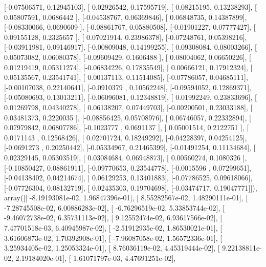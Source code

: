 \documentclass{article}
\begin{document}
       [-0.07506571,  0.12945103],
       [ 0.02926542,  0.17595719],
       [ 0.08215195,  0.13238293],
       [ 0.05807591,  0.0686442 ],
       [-0.04538767,  0.06369846],
       [ 0.06848735,  0.14387899],
       [-0.08330066,  0.0690609 ],
       [-0.08861767,  0.05880508],
       [-0.01901227,  0.07777427],
       [ 0.09155128,  0.2325657 ],
       [ 0.07021914,  0.23986378],
       [-0.07248761,  0.05398216],
       [-0.03911981,  0.09146917],
       [-0.00809048,  0.14199255],
       [ 0.09308084,  0.08003266],
       [ 0.05073082,  0.06080378],
       [-0.09609429,  0.1606488 ],
       [ 0.08004062,  0.06650226],
       [ 0.01219419,  0.05311274],
       [-0.06834226,  0.17835549],
       [ 0.00666121,  0.17912324],
       [ 0.05135567,  0.23541741],
       [ 0.00137113,  0.11514085],
       [-0.07786057,  0.04685111],
       [-0.00107038,  0.22140641],
       [-0.0910379 ,  0.10562248],
       [-0.09594052,  0.12869371],
       [-0.05080693,  0.13013211],
       [-0.06096081,  0.12348819],
       [ 0.01992249,  0.23833696],
       [ 0.01269798,  0.04340278],
       [ 0.06138207,  0.07449703],
       [-0.00200501,  0.23033188],
       [ 0.03481373,  0.2220035 ],
       [-0.08856425,  0.05708976],
       [ 0.06746057,  0.22332894],
       [ 0.07979842,  0.06807786],
       [-0.1023777 ,  0.0691137 ],
       [ 0.05001514,  0.2122751 ],
       [ 0.0171143 ,  0.12568426],
       [ 0.02701724,  0.18249292],
       [-0.04228397,  0.04254125],
       [-0.0691273 ,  0.20250442],
       [-0.05334967,  0.21465399],
       [-0.01491254,  0.11134684],
       [ 0.02329145,  0.05303519],
       [ 0.03084684,  0.06948873],
       [ 0.00560274,  0.1080326 ],
       [-0.10850427,  0.08861911],
       [-0.09770653,  0.23544778],
       [-0.0015596 ,  0.07299651],
       [-0.04138402,  0.04214674],
       [ 0.06129253,  0.13401883],
       [-0.07786525,  0.09618066],
       [-0.07726304,  0.08132719],
       [ 0.02435303,  0.19704698],
       [-0.03474717,  0.19047771]]), array([[ -8.19193081e-02,   1.96847396e-01],
       [  8.55282567e-02,   1.48290111e-01],
       [ -7.28745508e-02,   6.00886283e-02],
       [ -6.76296519e-02,   5.33853744e-02],
       [ -9.46072738e-02,   6.35731113e-02],
       [  9.12552474e-02,   6.93617566e-02],
       [  7.47701518e-03,   6.40945987e-02],
       [ -2.51912935e-02,   1.86530021e-01],
       [  3.61606873e-02,   1.70392908e-01],
       [ -7.96087058e-02,   1.56572336e-01],
       [  3.25934405e-02,   1.25053324e-01],
       [  8.76036119e-02,   4.45319444e-02],
       [  9.22138811e-02,   2.19184020e-01],
       [  1.61071797e-03,   4.47691251e-02],
\end{document}
